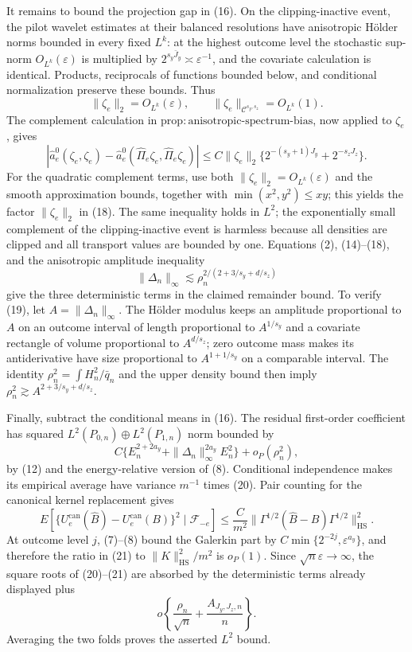 It remains to bound the projection gap in (16). On the clipping-inactive event, the pilot wavelet estimates at their balanced resolutions have anisotropic H\"older norms bounded in every fixed \(L^k\): at the highest outcome level the stochastic sup-norm \(O_{L^k}(\varepsilon)\) is multiplied by \(2^{s_y\bar J_y}\asymp\varepsilon^{-1}\), and the covariate calculation is identical. Products, reciprocals of functions bounded below, and conditional normalization preserve these bounds. Thus
\[
\|\zeta_e\|_2=O_{L^k}(\varepsilon),
\qquad
\|\zeta_e\|_{\mathcal C^{s_y,s_z}}=O_{L^k}(1).                 \tag{17}
\]
The complement calculation in \(\mathrm{prop{:}anisotropic\text{-}spectrum\text{-}bias}\), now applied to \(\zeta_e\), gives
\[
|\widehat a_e^0(\zeta_e,\zeta_e)
-\widehat a_e^0(\widehat\Pi_e\zeta_e,\widehat\Pi_e\zeta_e)|
\le C\|\zeta_e\|_2
\{2^{-(s_y+1)J_y}+2^{-s_zJ_z}\}.                               \tag{18}
\]
For the quadratic complement terms, use both \(\|\zeta_e\|_2=O_{L^k}(\varepsilon)\) and the smooth approximation bounds, together with \(\min(x^2,y^2)\le xy\); this yields the factor \(\|\zeta_e\|_2\) in (18). The same inequality holds in \(L^2\); the exponentially small complement of the clipping-inactive event is harmless because all densities are clipped and all transport values are bounded by one. Equations (2), (14)--(18), and the anisotropic amplitude inequality
\[
\|\Delta_n\|_\infty
\lesssim\rho_n^{2/(2+3/s_y+d/s_z)}                              \tag{19}
\]
give the three deterministic terms in the claimed remainder bound. To verify (19), let \(A=\|\Delta_n\|_\infty\). The H\"older modulus keeps an amplitude proportional to \(A\) on an outcome interval of length proportional to \(A^{1/s_y}\) and a covariate rectangle of volume proportional to \(A^{d/s_z}\); zero outcome mass makes its antiderivative have size proportional to \(A^{1+1/s_y}\) on a comparable interval. The identity \(\rho_n^2=\int H_n^2/\bar q_n\) and the upper density bound then imply \(\rho_n^2\gtrsim A^{2+3/s_y+d/s_z}\).

Finally, subtract the conditional means in (16). The residual first-order coefficient has squared \(L^2(P_{0,n})\oplus L^2(P_{1,n})\) norm bounded by
\[
C\{E_n^{2+2a_y}+\|\Delta_n\|_\infty^{2a_y}E_n^2\}+o_P(\rho_n^2), \tag{20}
\]
by (12) and the energy-relative version of (8). Conditional independence makes its empirical average have variance \(m^{-1}\) times (20). Pair counting for the canonical kernel replacement gives
\[
E[\{U_e^{\mathrm{can}}(\widehat B)-U_e^{\mathrm{can}}(B)\}^2\mid\mathscr F_{-e}]
\le\frac C{m^2}\|\Gamma^{1/2}(\widehat B-B)\Gamma^{1/2}\|_{\mathrm{HS}}^2. \tag{21}
\]
At outcome level \(j\), (7)--(8) bound the Galerkin part by \(C\min\{2^{-2j},\varepsilon^{a_y}\}\), and therefore the ratio in (21) to \(\|K\|_{\mathrm{HS}}^2/m^2\) is \(o_P(1)\). Since \(\sqrt n\varepsilon\to\infty\), the square roots of (20)--(21) are absorbed by the deterministic terms already displayed plus
\[
o\!\left\{\frac{\rho_n}{\sqrt n}+\frac{A_{J_y,J_z,n}}n\right\}. \tag{22}
\]
Averaging the two folds proves the asserted \(L^2\) bound.

